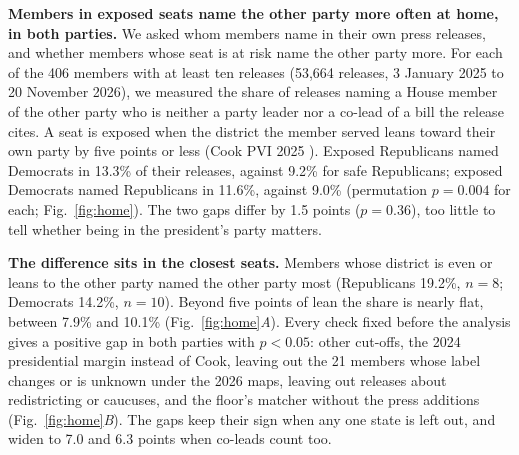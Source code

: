 %

\textbf{Members in exposed seats name the other party more often at home, in both parties.} We asked whom members name in their own press releases, and whether members whose seat is at risk name the other party more. For each of the 406 members with at least ten releases (53,664 releases, 3 January 2025 to 20 November 2026), we measured the share of releases naming a House member of the other party who is neither a party leader nor a co-lead of a bill the release cites. A seat is exposed when the district the member served leans toward their own party by five points or less (Cook PVI 2025 \cite{cook2025pvi}). Exposed Republicans named Democrats in 13.3\% of their releases, against 9.2\% for safe Republicans; exposed Democrats named Republicans in 11.6\%, against 9.0\% (permutation $p = 0.004$ for each; Fig.~\ref{fig:home}). The two gaps differ by 1.5 points ($p = 0.36$), too little to tell whether being in the president's party matters.

\textbf{The difference sits in the closest seats.} Members whose district is even or leans to the other party named the other party most (Republicans 19.2\%, $n = 8$; Democrats 14.2\%, $n = 10$). Beyond five points of lean the share is nearly flat, between 7.9\% and 10.1\% (Fig.~\ref{fig:home}\emph{A}). Every check fixed before the analysis gives a positive gap in both parties with $p < 0.05$: other cut-offs, the 2024 presidential margin instead of Cook, leaving out the 21 members whose label changes or is unknown under the 2026 maps, leaving out releases about redistricting or caucuses, and the floor's matcher without the press additions (Fig.~\ref{fig:home}\emph{B}). The gaps keep their sign when any one state is left out, and widen to 7.0 and 6.3 points when co-leads count too.

